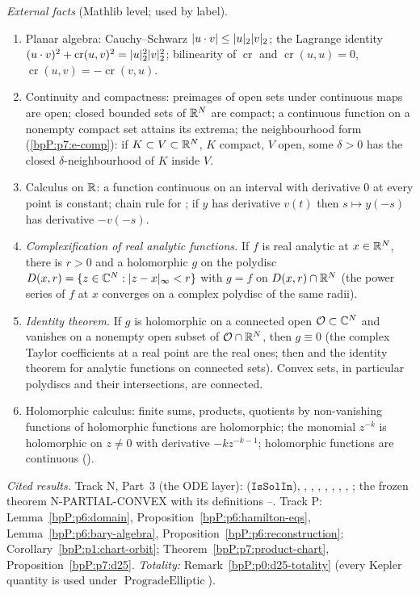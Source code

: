 \emph{External facts} (Mathlib level; used by label).
\begin{enumerate}[label=(X\arabic*),ref=(X\arabic*)]
\item\label{bpP:p14:x-planar} Planar algebra: Cauchy--Schwarz $\lvert u\cdot v\rvert\le\lvert u\rvert_2\lvert v\rvert_2$; the Lagrange identity $(u\cdot v)^2+\operatorname{cr}(u,v)^2=\lvert u\rvert_2^2\lvert v\rvert_2^2$; bilinearity of $\operatorname{cr}$ and $\operatorname{cr}(u,u)=0$, $\operatorname{cr}(u,v)=-\operatorname{cr}(v,u)$.
\item\label{bpP:p14:x-top} Continuity and compactness: preimages of open sets under continuous maps are open; closed bounded sets of $\mathbb{R}^N$ are compact; a continuous function on a nonempty compact set attains its extrema; the neighbourhood form (\ref{bpP:p7:e-comp}): if $K\subset V\subset\mathbb{R}^N$, $K$ compact, $V$ open, some $\delta>0$ has the closed $\delta$-neighbourhood of $K$ inside $V$.
\item\label{bpP:p14:x-calc} Calculus on $\mathbb{R}$: a function continuous on an interval with derivative $0$ at every point is constant; chain rule for ; if $y$ has derivative $v(t)$ then $s\mapsto y(-s)$ has derivative $-v(-s)$.
\item\label{bpP:p14:x-cx} \emph{Complexification of real analytic functions.} If $f$ is real analytic at $x\in\mathbb{R}^N$, there is $r>0$ and a holomorphic $g$ on the polydisc $D(x,r)=\{z\in\mathbb{C}^N:\lvert z-x\rvert_\infty<r\}$ with $g=f$ on $D(x,r)\cap\mathbb{R}^N$ (the power series of $f$ at $x$ converges on a complex polydisc of the same radii).
\item\label{bpP:p14:x-id} \emph{Identity theorem.} If $g$ is holomorphic on a connected open $\mathcal O\subset\mathbb{C}^N$ and vanishes on a nonempty open subset of $\mathcal O\cap\mathbb{R}^N$, then $g\equiv0$ (the complex Taylor coefficients at a real point are the real ones; then  and the identity theorem for analytic functions on connected sets). Convex sets, in particular polydiscs and their intersections, are connected.
\item\label{bpP:p14:x-hol} Holomorphic calculus: finite sums, products, quotients by non-vanishing functions of holomorphic functions are holomorphic; the monomial $z^{-k}$ is holomorphic on $z\ne0$ with derivative $-kz^{-k-1}$; holomorphic functions are continuous ().
\end{enumerate}
\emph{Cited results.} Track N, Part~3 (the ODE layer):  ($\texttt{IsSolIn}$), , , , ,
, , , ; the frozen theorem N-PARTIAL-CONVEX  with its definitions
--. Track P: Lemma~\ref{bpP:p6:domain}, Proposition~\ref{bpP:p6:hamilton-eqs}, Lemma~\ref{bpP:p6:bary-algebra}, Proposition~\ref{bpP:p6:reconstruction}; Corollary~\ref{bpP:p1:chart-orbit};
Theorem~\ref{bpP:p7:product-chart}, Proposition~\ref{bpP:p7:d25}. \emph{Totality:} Remark~\ref{bpP:p0:d25-totality} (every Kepler quantity is used under $\operatorname{ProgradeElliptic}$).


